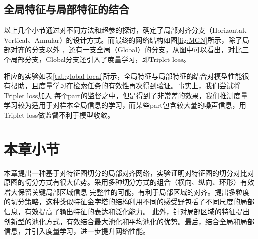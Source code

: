 \subsection{全局特征与局部特征的结合}
以上几个小节通过对不同方法和超参的探讨，确定了局部对齐分支（Horizontal、Vertical、Annular）的设计方式。而最终的网络结构如图\ref{fig:MGN}所示，除了局部对齐的分支以外
，还有一支全局（Global）的分支，从图中可以看出，对比三个局部分支，Global分支还引入了度量学习，即Triplet loss。


相应的实验如表\ref{tab:global-local}所示，全局特征与局部特征的结合对模型性能很有帮助，且度量学习在检索任务的有效性再次得到验证。事实上，我们尝试将Triplet loss加入
每个part的监督之中，但是得到了非常差的效果，我们推测度量学习较为适用于对样本全局信息的学习，而某些part包含较大量的噪声信息，用Triplet loss做监督不利于模型收敛。

\section{本章小节}
本章提出一种基于对特征图切分的局部对齐网络，实验证明对特征图的切分对比对原图的切分方式有很大优势。采用多种切分方式的组合（横向、纵向、环形）有效增大保留关键局部区域信息
完整性的可能，有利于局部区域的对齐。提出多粒度的切分策略，这种类似特征金字塔的结构利用不同的感受野包括了不同尺度的局部信息，有效提高了输出特征的表达和泛化能力。
此外，针对局部区域的特征提出创新型的池化方式，有效结合最大池化和平均池化的优势。最后，结合全局和局部信息，并引入度量学习，进一步提升网络性能。
